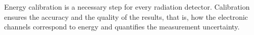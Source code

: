 Energy calibration is a necessary step for every radiation detector. Calibration ensures the accuracy and the quality of the results, that is, how the electronic channels correspond to energy and quantifies the measurement uncertainty. 
